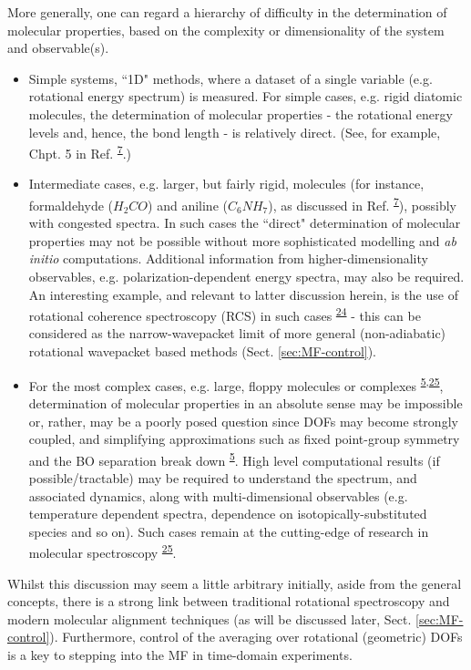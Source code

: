 \documentclass[10pt]{article}
\begin{document}
More generally, one can regard a hierarchy of difficulty in the determination of molecular properties, based on the complexity or dimensionality of the system and observable(s).
\begin{itemize}
\item Simple systems, ``1D" methods, where a dataset of a single variable (e.g. rotational energy spectrum) is measured. For simple cases, e.g. rigid diatomic molecules, the determination of molecular properties - the rotational energy levels and, hence, the bond length - is relatively direct. (See, for example, Chpt. 5 in Ref. \textsuperscript{\hyperref[csl:7]{7}}.) %
\item Intermediate cases, e.g. larger, but fairly rigid, molecules (for instance, formaldehyde ($H_2CO$) and aniline ($C_6NH_7$), as discussed in Ref. \textsuperscript{\hyperref[csl:7]{7}}), possibly with congested spectra. In such cases the ``direct" determination of molecular properties may not be possible without more sophisticated modelling and \textit{ab initio} computations. Additional information from higher-dimensionality observables, e.g. polarization-dependent energy spectra, may also be required. An interesting example, and relevant to latter discussion herein, is the use of rotational coherence spectroscopy (RCS) in such cases \textsuperscript{\hyperref[csl:24]{24}} - this can be considered as the narrow-wavepacket limit of more general (non-adiabatic) rotational wavepacket based methods (Sect. \ref{sec:MF-control}).
\item For the most complex cases, e.g. large, floppy molecules or complexes \textsuperscript{\hyperref[csl:5]{5},\hyperref[csl:25]{25}}, determination of molecular properties in an absolute sense may be impossible or, rather, may be a poorly posed question since DOFs may become strongly coupled, and simplifying approximations such as fixed point-group symmetry and the BO separation break down \textsuperscript{\hyperref[csl:5]{5}}. High level computational results (if possible/tractable) may be required to understand the spectrum, and associated dynamics, along with multi-dimensional observables (e.g. temperature dependent spectra, dependence on isotopically-substituted species and so on). Such cases remain at the cutting-edge of research in molecular spectroscopy \textsuperscript{\hyperref[csl:25]{25}}.
\end{itemize}    

Whilst this discussion may seem a little arbitrary initially, aside from the general concepts, there is a strong link between traditional rotational spectroscopy and modern molecular alignment techniques (as will be discussed later, Sect. \ref{sec:MF-control}). Furthermore, control of the averaging over rotational (geometric) DOFs is a key to stepping into the MF in time-domain experiments.
\end{document}
